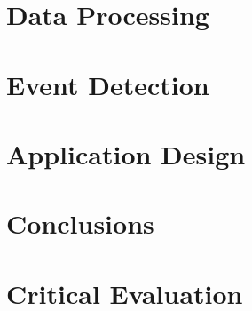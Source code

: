 \documentclass[11pt, a4paper]{scrartcl}
\begin{document}
\section{Data Processing}






\section{Event Detection} \label{sec:eventdetection}


\section{Application Design}


\section{Conclusions}

\section{Critical Evaluation}



	
\end{document}

